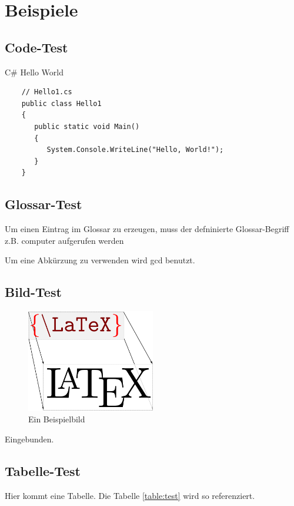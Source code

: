 \chapter*{Beispiele}
\section*{Code-Test}
\blindtext

    \begin{listing}[]
    \caption{C\# Hello World}
    \label{listing:helloWorld}
    \begin{verbatim}
    // Hello1.cs
    public class Hello1
    {
       public static void Main()
       {
          System.Console.WriteLine("Hello, World!");
       }
    }
    \end{verbatim}
    \end{listing}

\blindtext
\newpage

\section*{Glossar-Test}
Um einen Eintrag im Glossar zu erzeugen, muss der defninierte Glossar-Begriff z.B. \Gls{computer} aufgerufen werden

Um eine Abkürzung zu verwenden wird \gls{gcd} benutzt.
\newpage


\section*{Bild-Test}
\blindtext

	\begin{figure}[h]
	\centering
	\includegraphics[width=0.5\textwidth]{Images/latex}
	\caption{Ein Beispielbild}%
	\label{figure:latex}%
	\end{figure}

Eingebunden.
\blindtext
\newpage

\section*{Tabelle-Test}
Hier kommt eine Tabelle.
Die Tabelle \ref{table:test} wird so referenziert.
\blindtext
 
